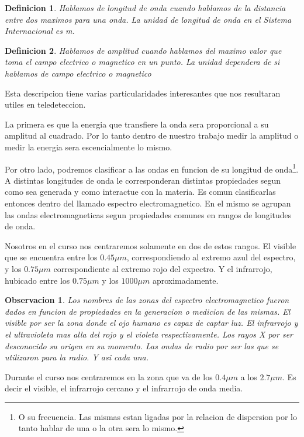 \documentclass[a4paper,12pt]{article}
\newtheorem{dex}{Definicion}[section]
\newtheorem*{obs}{Observacion}
\begin{document}
\begin{dex}
  Hablamos de longitud de onda cuando hablamos de la distancia entre dos maximos
  para una onda. La unidad de longitud de onda en el Sistema Internacional es m.
\end{dex}

\begin{dex}
  Hablamos de amplitud cuando hablamos del maximo valor que toma el campo
  electrico o magnetico en un punto. La unidad dependera de si hablamos de campo
  electrico o magnetico
\end{dex}

Esta descripcion tiene varias particularidades interesantes que nos resultaran
utiles en teledeteccion.

La primera es que la energia que transfiere la onda sera proporcional a su
amplitud al cuadrado. Por lo tanto dentro de nuestro trabajo medir la amplitud o
medir la energia sera escencialmente lo mismo.

Por otro lado, podremos clasificar a las ondas en funcion de su longitud de
onda\footnote{O su frecuencia. Las mismas estan ligadas por la relacion de
dispersion por lo tanto hablar de una o la otra sera lo mismo.}. A distintas
longitudes de onda le corresponderan distintas propiedades segun como sea
generada y como interactue con la materia. Es comun clasificarlas entonces
dentro del llamado espectro electromagnetico. En el mismo se agrupan las ondas
electromagneticas segun propiedades comunes en rangos de longitudes de onda.

Nosotros en el curso nos centraremos solamente en dos de estos rangos. El
visible que se encuentra entre los $0.45 \mu m$, correspondiendo al extremo azul
del espectro, y los $0.75 \mu m$ correspondiente al extremo rojo del expectro. Y
el infrarrojo, hubicado entre los $0.75 \mu m$ y los $1000 \mu m$
aproximadamente. 

\begin{obs}
  Los nombres de las zonas del espectro electromagnetico fueron dados en funcion
  de propiedades en la generacion o medicion de las mismas. El visible por ser
  la zona donde el ojo humano es capaz de captar luz. El infrarrojo y el
  ultravioleta mas alla del rojo y el violeta respectivamente. Los rayos X por
  ser desconocido su origen en su momento. Las ondas de radio por ser las que se
  utilizaron para la radio. Y asi cada una.
\end{obs}

Durante el curso nos centraremos en la zona que va de los $0.4 \mu m$ a los $2.7
\mu m$. Es decir el visible, el infrarrojo cercano y el infrarrojo de onda
media.
\end{document}
